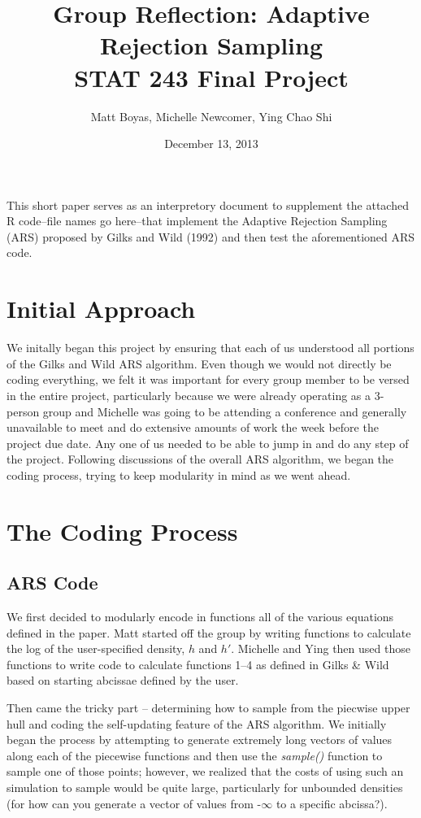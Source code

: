 \documentclass{article}
\begin{document}
\lstset{language=R, basicstyle=\ttfamily, columns=flexible}
    
\title{Group Reflection: Adaptive Rejection Sampling\\STAT 243 Final Project}
\author{Matt Boyas, Michelle Newcomer, Ying Chao Shi}

\date{December 13, 2013}
\maketitle
This short paper serves as an interpretory document to supplement the attached R code--file names go here--that implement the Adaptive Rejection Sampling (ARS) proposed by Gilks and Wild (1992) and then test the aforementioned ARS code.
\section{Initial Approach}
We initally began this project by ensuring that each of us understood all portions of the Gilks and Wild ARS algorithm.  Even though we would not directly be coding everything, we felt it was important for every group member to be versed in the entire project, particularly because we were already operating as a 3-person group and Michelle was going to be attending a conference and generally unavailable to meet and do extensive amounts of work the week before the project due date.  Any one of us needed to be able to jump in and do any step of the project.  Following discussions of the overall ARS algorithm, we began the coding process, trying to keep modularity in mind as we went ahead. 
 
\section{The Coding Process}
\subsection{ARS Code}
We first decided to modularly encode in functions all of the various equations defined in the paper.  Matt started off the group by writing functions to calculate the log of the user-specified density, $h$ and $h'$.  Michelle and Ying then used those functions to write code to calculate functions 1--4 as defined in Gilks \& Wild based on starting abcissae defined by the user. 

Then came the tricky part -- determining how to sample from the piecwise upper hull and coding the self-updating feature of the ARS algorithm.  We initially began the process by attempting to generate extremely long vectors of values along each of the piecewise functions and then use the \textit{sample()} function to sample one of those points; however, we realized that the costs of using such an simulation to sample would be quite large, particularly for unbounded densities (for how can you generate a vector of values from -$\infty$ to a specific abcissa?).  
\end{document}
